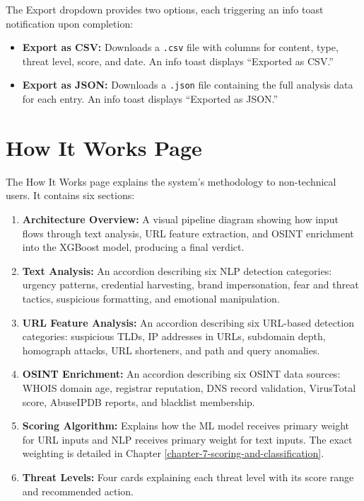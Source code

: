 The Export dropdown provides two options, each triggering an info toast notification upon completion:
\begin{itemize}
\item \textbf{Export as CSV:} Downloads a \texttt{.csv} file with columns for content, type, threat level, score, and date. An info toast displays ``Exported as CSV.''
\item \textbf{Export as JSON:} Downloads a \texttt{.json} file containing the full analysis data for each entry. An info toast displays ``Exported as JSON.''
\end{itemize}

\section{How It Works Page}

The How It Works page explains the system's methodology to non-technical users. It contains six sections:

\begin{enumerate}
\item \textbf{Architecture Overview:} A visual pipeline diagram showing how input flows through text analysis, URL feature extraction, and OSINT enrichment into the XGBoost model, producing a final verdict.
\item \textbf{Text Analysis:} An accordion describing six NLP detection categories: urgency patterns, credential harvesting, brand impersonation, fear and threat tactics, suspicious formatting, and emotional manipulation.
\item \textbf{URL Feature Analysis:} An accordion describing six URL-based detection categories: suspicious TLDs, IP addresses in URLs, subdomain depth, homograph attacks, URL shorteners, and path and query anomalies.
\item \textbf{OSINT Enrichment:} An accordion describing six OSINT data sources: WHOIS domain age, registrar reputation, DNS record validation, VirusTotal score, AbuseIPDB reports, and blacklist membership.
\item \textbf{Scoring Algorithm:} Explains how the ML model receives primary weight for URL inputs and NLP receives primary weight for text inputs. The exact weighting is detailed in Chapter \ref{chapter-7-scoring-and-classification}.
\item \textbf{Threat Levels:} Four cards explaining each threat level with its score range and recommended action.
\end{enumerate}

